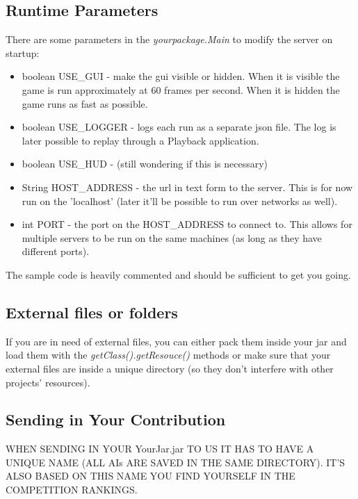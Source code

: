 \documentclass[10pt,a4paper]{article}
\begin{document}

\subsection{Runtime Parameters}

There are some parameters in the \textit{yourpackage.Main} to modify the server on startup:
\begin{itemize}

\item boolean USE\_GUI - make the gui visible or hidden. When it is visible the game is run approximately at 60 frames per second. When it is hidden the game runs as fast as possible.

\item boolean USE\_LOGGER - logs each run as a separate json file. The log is later possible to replay through a Playback application.

\item boolean USE\_HUD - (still wondering if this is necessary)

\item String HOST\_ADDRESS - the url in text form to the server. This is for now run on the 'localhost' (later it'll be possible to run over networks as well).

\item int PORT - the port on the HOST\_ADDRESS to connect to. This allows for multiple servers to be run on the same machines (as long as they have different ports).

\end{itemize}

The sample code is heavily commented and should be sufficient to get you going.

\subsection{External files or folders}

If you are in need of external files, you can either pack them inside your jar and load them with the \textit{getClass().getResouce()} methods or make sure that your external files are inside a unique directory (so they don't interfere with other projects' resources).


\subsection{Sending in Your Contribution}


WHEN SENDING IN YOUR YourJar.jar TO US IT HAS TO HAVE A UNIQUE NAME (ALL AIs ARE SAVED IN THE SAME DIRECTORY). IT'S ALSO BASED ON THIS NAME YOU FIND YOURSELF IN THE COMPETITION RANKINGS.

\end{document}
